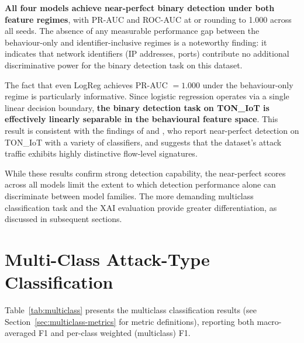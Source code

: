 \documentclass[12pt,a4paper]{report}
\begin{document}
\textbf{All four models achieve near-perfect binary detection under both feature regimes}, with PR-AUC and ROC-AUC at or rounding to 1.000 across all seeds. The absence of any measurable performance gap between the behaviour-only and identifier-inclusive regimes is a noteworthy finding: it indicates that network identifiers (IP addresses, ports) contribute no additional discriminative power for the binary detection task on this dataset.

The fact that even LogReg achieves PR-AUC $= 1.000$ under the behaviour-only regime is particularly informative. Since logistic regression operates via a single linear decision boundary, \textbf{the binary detection task on TON\_IoT is effectively linearly separable in the behavioural feature space}. This result is consistent with the findings of \citet{alsaedi2020} and \citet{moustafa2021}, who report near-perfect detection on TON\_IoT with a variety of classifiers, and suggests that the dataset's attack traffic exhibits highly distinctive flow-level signatures.

While these results confirm strong detection capability, the near-perfect scores across all models limit the extent to which detection performance alone can discriminate between model families. The more demanding multiclass classification task and the XAI evaluation provide greater differentiation, as discussed in subsequent sections.

\section{Multi-Class Attack-Type Classification}
\label{sec:multiclass-results}

Table~\ref{tab:multiclass} presents the multiclass classification results (see Section~\ref{sec:multiclass-metrics} for metric definitions), reporting both macro-averaged F1 and per-class weighted (multiclass) F1.
\end{document}
